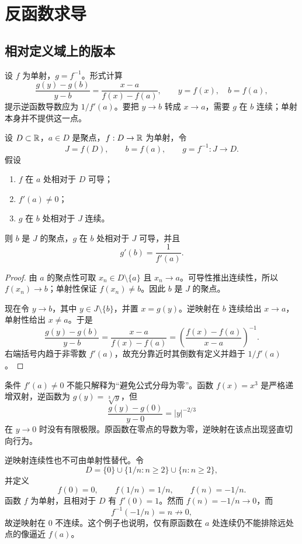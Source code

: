 \section{反函数求导}

\subsection{相对定义域上的版本}

设 \(f\) 为单射，\(g=f^{-1}\)。形式计算
\[
 \frac{g(y)-g(b)}{y-b}
 =\frac{x-a}{f(x)-f(a)},
 \qquad y=f(x),\quad b=f(a),
\]
提示逆函数导数应为 \(1/f'(a)\)。要把 \(y\to b\) 转成 \(x\to a\)，需要 \(g\) 在 \(b\) 连续；单射本身并不提供这一点。

\begin{theorem}[反函数求导]
\label{thm:inverse-derivative-relative}
设 \(D\subset\mathbb{R}\)，\(a\in D\) 是聚点，\(f:D\to\mathbb{R}\) 为单射，令
\[
 J=f(D),\qquad b=f(a),\qquad g=f^{-1}:J\to D.
\]
假设
\begin{enumerate}
 \item \(f\) 在 \(a\) 处相对于 \(D\) 可导；
 \item \(f'(a)\ne0\)；
 \item \(g\) 在 \(b\) 处相对于 \(J\) 连续。
\end{enumerate}
则 \(b\) 是 \(J\) 的聚点，\(g\) 在 \(b\) 处相对于 \(J\) 可导，并且
\[
 g'(b)=\frac1{f'(a)}.
\]
\end{theorem}

\begin{proof}
由 \(a\) 的聚点性可取 \(x_n\in D\setminus\{a\}\) 且 \(x_n\to a\)。可导性推出连续性，所以 \(f(x_n)\to b\)；单射性保证 \(f(x_n)\ne b\)。因此 \(b\) 是 \(J\) 的聚点。

现在令 \(y\to b\)，其中 \(y\in J\setminus\{b\}\)，并置 \(x=g(y)\)。逆映射在 \(b\) 连续给出 \(x\to a\)，单射性给出 \(x\ne a\)。于是
\[
 \frac{g(y)-g(b)}{y-b}
 =\frac{x-a}{f(x)-f(a)}
 =\left(\frac{f(x)-f(a)}{x-a}\right)^{-1}.
\]
右端括号内趋于非零数 \(f'(a)\)，故充分靠近时其倒数有定义并趋于 \(1/f'(a)\)。
\end{proof}

条件 \(f'(a)\ne0\) 不能只解释为“避免公式分母为零”。函数 \(f(x)=x^3\) 是严格递增双射，逆函数为 \(g(y)=\sqrt[3]{y}\)，但
\[
 \frac{g(y)-g(0)}{y-0}=|y|^{-2/3}
\]
在 \(y\to0\) 时没有有限极限。原函数在零点的导数为零，逆映射在该点出现竖直切向行为。

逆映射连续性也不可由单射性替代。令
\[
 D=\{0\}\cup\{1/n:n\ge2\}\cup\{n:n\ge2\},
\]
并定义
\[
 f(0)=0,\qquad f(1/n)=1/n,\qquad f(n)=-1/n.
\]
函数 \(f\) 为单射，且相对于 \(D\) 有 \(f'(0)=1\)。然而 \(f(n)=-1/n\to0\)，而
\[
 f^{-1}(-1/n)=n\not\to0,
\]
故逆映射在 \(0\) 不连续。这个例子也说明，仅有原函数在 \(a\) 处连续仍不能排除远处点的像逼近 \(f(a)\)。


